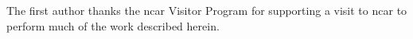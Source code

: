 


%





%
\begin{acks}
The first author thanks the
\gls{ncar} Visitor Program for supporting a visit to \gls{ncar} to
perform much of the work described herein.


\end{acks}
